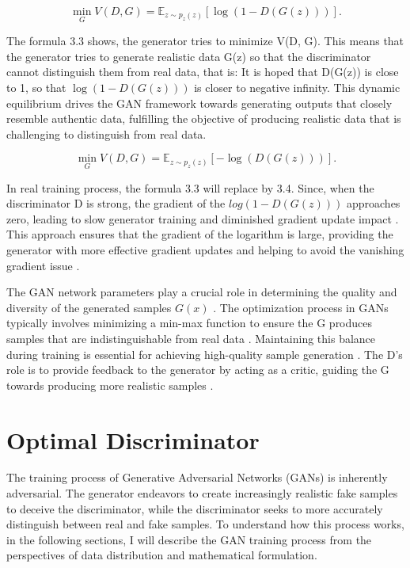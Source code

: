 \begin{equation}
    \min_{G} V(D, G) = \mathbb{E}_{z \sim p_{z}(z)} [\log(1 - D(G(z)))].
\end{equation}


The formula 3.3 shows, the generator tries to minimize V(D, G). 
This means that the generator tries to generate realistic data G(z) so that the discriminator cannot distinguish 
them from real data, that is: It is hoped that D(G(z)) is close to 1, so that $\log (1 - D(G(z)))$ is closer to negative infinity.
This dynamic equilibrium drives the GAN framework towards generating outputs that closely resemble authentic data, 
fulfilling the objective of producing realistic data that is challenging to distinguish from real data.


\begin{equation}
    \min_{G} V(D, G) = \mathbb{E}_{z \sim p_{z}(z)} [-\log(D(G(z)))].
\end{equation}

In real training process, the formula 3.3 will replace by 3.4. Since, when the discriminator D is strong, 
the gradient of the $log(1 - D(G(z)))$ approaches zero, leading to slow generator training and diminished gradient update impact \citep{10.1007/s11263-019-01265-2}.  
This approach ensures that the gradient of the logarithm is large, providing the generator with more effective gradient updates and 
helping to avoid the vanishing gradient issue \citep{10.1109/tpami.2018.2872043}.



The GAN network parameters play a crucial role in determining the quality and diversity of 
the generated samples $G(x)$ \citep{10.1007/s10928-021-09787-4}. The optimization process in GANs 
typically involves minimizing a min-max function to ensure the G produces samples that 
are indistinguishable from real data \citep{10.1109/taslp.2017.2761547}. Maintaining this balance 
during training is essential for achieving high-quality sample generation \citep{10.1007/s10928-021-09787-4}. 
The D's role is to provide feedback to the generator by acting as a critic, 
guiding the G towards producing more realistic samples \citep{10.48550/arxiv.1802.05637}.



\section*{Optimal Discriminator}

The training process of Generative Adversarial Networks (GANs) is inherently adversarial. 
The generator endeavors to create increasingly realistic fake samples to deceive the discriminator, 
while the discriminator seeks to more accurately distinguish between real and fake samples. 
To understand how this process works, in the following sections, 
I will describe the GAN training process from the perspectives of data distribution and mathematical formulation.

